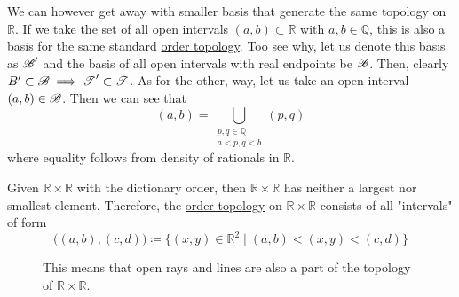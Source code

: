   \begin{example}
    \label{ex:basis-of-open-intervals-with-rational-endpoints}
    We can however get away with smaller basis that generate the same topology on $\mathbb{R}$. If we take the set of all open intervals $(a, b) \subset \mathbb{R}$ with $a, b \in \mathbb{Q}$, this is also a basis for the same standard \hyperref[def:order-topology]{order topology}. Too see why, let us denote this basis as $\operatorname{\mathscr{B}}^\prime$ and the basis of all open intervals with real endpoints be $\operatorname{\mathscr{B}}$. Then, clearly $B^\prime \subset \operatorname{\mathscr{B}} \implies \operatorname{\mathscr{T}}^\prime \subset \operatorname{\mathscr{T}}$. As for the other, way, let us take an open interval $(a, b) \in \operatorname{\mathscr{B}}$. Then we can see that 
    \begin{equation}
      (a, b) = \bigcup_{\substack{p, q \in \mathbb{Q} \\ a < p, q < b}} (p, q)
    \end{equation}
    where equality follows from density of rationals in $\mathbb{R}$. 
  \end{example}

  \begin{example}
    \label{ex:r2-with-dictionary-order}
    Given $\mathbb{R} \times \mathbb{R}$ with the dictionary order, then $\mathbb{R} \times \mathbb{R}$ has neither a largest nor smallest element. Therefore, the \hyperref[def:order-topology]{order topology} on $\mathbb{R} \times \mathbb{R}$ consists of all "intervals" of form
    \begin{equation}
      \big((a, b), (c, d) \big) \coloneqq  \{(x, y) \in \mathbb{R}^2 \mid (a, b) < (x, y) < (c, d)\}
    \end{equation}

    \begin{figure}[H]
      \centering 
      \caption{This means that open rays and lines are also a part of the topology of $\mathbb{R} \times \mathbb{R}$. } 
      \label{fig:r2_dict_order}
    \end{figure}
  \end{example}


